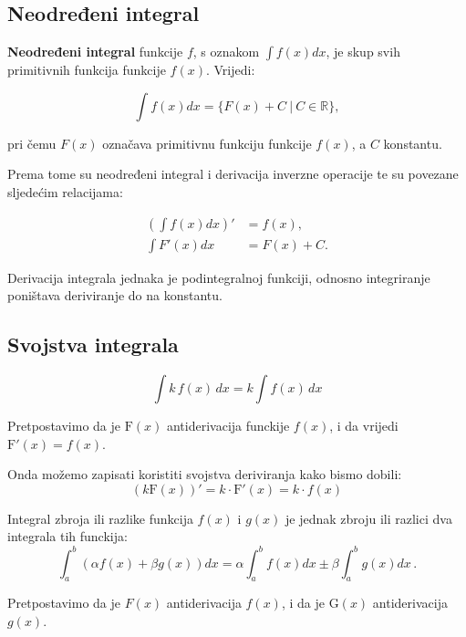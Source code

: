 \subsection{Neodređeni integral}

\textbf{Neodređeni integral} funkcije $f$, s oznakom $\int f(x)dx$, je skup svih
primitivnih funkcija funkcije $f(x)$. Vrijedi:

$$
\int f(x)dx = \{F(x) + C\ |\ C\in\mathbb{R}\},
$$

pri čemu $F(x)$ označava primitivnu funkciju funkcije $f(x)$, a $C$ konstantu.

Prema tome su neodređeni integral i derivacija inverzne operacije te su povezane
sljedećim relacijama:

\begin{align*}
    \left(\int f(x) dx\right)' &= f(x),\\
    \int F'(x) dx &= F(x) + C.
\end{align*}

Derivacija integrala jednaka je podintegralnoj funkciji, odnosno integriranje
poništava deriviranje do na konstantu.

\subsection{Svojstva integrala}

\begin{proposition}
    $$
    \int{{k\,f\left( x \right)\,dx}} = k\int{{f\left( x \right)\,dx}}
    $$
\end{proposition}

Pretpostavimo da je $\mathrm{F}(x)$ antiderivacija funckije $f(x)$,
i da vrijedi $\mathrm{F}'(x) = f(x)$.

Onda možemo zapisati koristiti svojstva deriviranja kako bismo dobili:
$$
    (k\mathrm{F}(x))' = k \cdot \mathrm{F}'(x) = k \cdot f(x)
$$

\begin{proposition}
    Integral zbroja ili razlike funkcija $f(x)$ i $g(x)$ je jednak zbroju ili razlici dva integrala tih funckija:
    $$
    \int_a^b (\alpha f(x) + \beta g(x))dx = \alpha \int_a^b f(x)dx \pm \beta \int_a^b g(x)dx\,.
    $$
\end{proposition}


Pretpostavimo da je $F\left( x \right)$ antiderivacija $f\left( x \right)$,
i da je $\mathrm{G}\left( x \right)$ antiderivacija $g\left( x \right)$.

